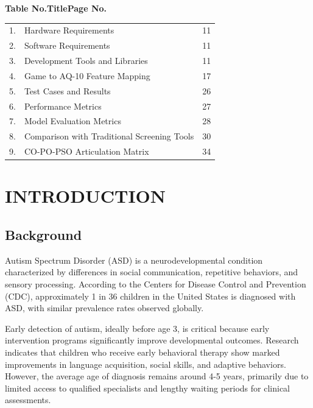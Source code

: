 \documentclass[12pt,letterpaper]{article}
\begin{document}
\vspace{1cm}

\begin{center}
\textbf{Table No.\hspace{4cm}Title\hspace{5cm}Page No.}
\end{center}

\vspace{0.5cm}

\begin{tabular}{clr}
1. & Hardware Requirements & 11 \\
2. & Software Requirements & 11 \\
3. & Development Tools and Libraries & 11 \\
4. & Game to AQ-10 Feature Mapping & 17 \\
5. & Test Cases and Results & 26 \\
6. & Performance Metrics & 27 \\
7. & Model Evaluation Metrics & 28 \\
8. & Comparison with Traditional Screening Tools & 30 \\
9. & CO-PO-PSO Articulation Matrix & 34 \\
\end{tabular}

\newpage



\section{INTRODUCTION}

\subsection{Background}

Autism Spectrum Disorder (ASD) is a neurodevelopmental condition characterized by differences in social communication, repetitive behaviors, and sensory processing. According to the Centers for Disease Control and Prevention (CDC), approximately 1 in 36 children in the United States is diagnosed with ASD, with similar prevalence rates observed globally.

Early detection of autism, ideally before age 3, is critical because early intervention programs significantly improve developmental outcomes. Research indicates that children who receive early behavioral therapy show marked improvements in language acquisition, social skills, and adaptive behaviors. However, the average age of diagnosis remains around 4-5 years, primarily due to limited access to qualified specialists and lengthy waiting periods for clinical assessments.
\end{document}
